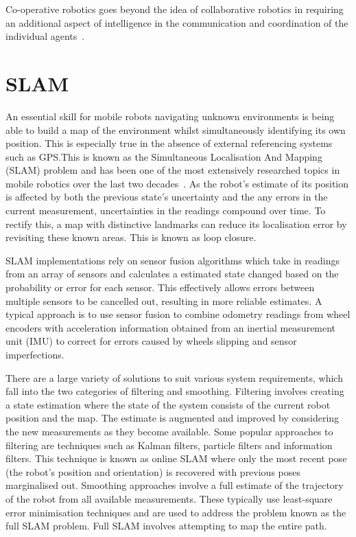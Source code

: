 {Co-operative robotics goes beyond the idea
of collaborative robotics in requiring an additional aspect of intelligence in
the communication and coordination of the individual agents~\cite{cao1995cooperative}.

\section{SLAM}\label{litreview/slam}
An essential skill for mobile robots navigating unknown environments is being
able to build a map of the environment whilst simultaneously identifying its own
position. This is especially true in the absence of external referencing systems
such as GPS.\@ This is known as the Simultaneous Localisation And Mapping (SLAM)
problem and has been one of the most extensively researched topics in mobile
robotics over the last two decades~\cite{grisetti2010tutorial}. As the robot's
estimate of its position is affected by both the previous state's uncertainty
and the any errors in the current measurement, uncertainties in the readings compound
over time. To rectify this, a map with distinctive landmarks can reduce its
localisation error by revisiting these known areas. This is known as loop closure.

SLAM implementations rely on sensor fusion algorithms which take in readings from an
array of sensors and calculates a estimated state changed based on the probability
or error for each sensor. This effectively allows errors between multiple sensors
to be cancelled out, resulting in more reliable estimates. A typical approach is to
use sensor fusion to combine odometry readings from wheel encoders with acceleration
information obtained from an inertial measurement unit (IMU) to correct for errors
caused by wheels slipping and sensor imperfections.

There are a large variety of solutions to suit various system requirements, which
fall into the two categories of filtering and smoothing. Filtering
involves creating a state estimation where the state of the system consists of
the current robot position and the map. The estimate is augmented and improved
by considering the new measurements as they become available. Some popular
approaches to filtering are techniques such as Kalman filters, particle filters
and information filters. This technique is known as online SLAM where only the most
recent pose (the robot's position and orientation) is recovered with previous poses
marginalised out. Smoothing approaches involve a full estimate of the trajectory of
the robot from all available
measurements. These typically use least-square error minimisation techniques and are
used to address the problem known as the full SLAM problem. Full SLAM involves
attempting to map the entire path.

}
